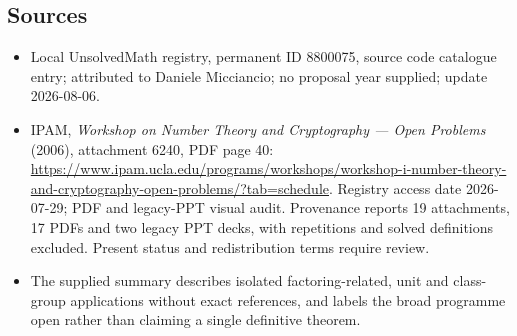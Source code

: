 \documentclass[11pt]{article}
\begin{document}
\subsection{Sources}
\begin{itemize}
\item Local UnsolvedMath registry, permanent ID 8800075, source code catalogue entry; attributed to Daniele Micciancio; no proposal year supplied; update 2026-08-06.
\item IPAM, \emph{Workshop on Number Theory and Cryptography --- Open Problems} (2006), attachment 6240, PDF page 40: \url{https://www.ipam.ucla.edu/programs/workshops/workshop-i-number-theory-and-cryptography-open-problems/?tab=schedule}. Registry access date 2026-07-29; PDF and legacy-PPT visual audit. Provenance reports 19 attachments, 17 PDFs and two legacy PPT decks, with repetitions and solved definitions excluded. Present status and redistribution terms require review.
\item The supplied summary describes isolated factoring-related, unit and class-group applications without exact references, and labels the broad programme open rather than claiming a single definitive theorem.
\end{itemize}
\end{document}
